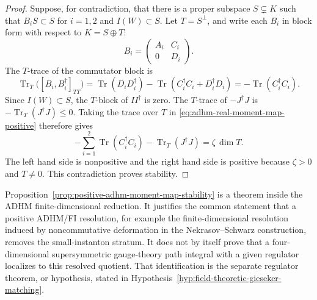 \begin{proof}
Suppose, for contradiction, that there is a proper subspace
\(S\subsetneq K\) such that \(B_iS\subset S\) for \(i=1,2\) and
\(I(W)\subset S\).  Let \(T=S^\perp\), and write each \(B_i\) in block form
with respect to \(K=S\oplus T\):
\[
  B_i=
  \begin{pmatrix}
    A_i&C_i\\
    0&D_i
  \end{pmatrix}.
\]
The \(T\)-trace of the commutator block is
\begin{equation}
  \operatorname{Tr}_T\!\bigl([B_i,B_i^\dagger]_{TT}\bigr)
  =
  \operatorname{Tr}(D_iD_i^\dagger)
  -\operatorname{Tr}(C_i^\dagger C_i+D_i^\dagger D_i)
  =
  -\operatorname{Tr}(C_i^\dagger C_i).
  \label{eq:adhm-stability-tt-commutator-trace}
\end{equation}
Since \(I(W)\subset S\), the \(T\)-block of \(II^\dagger\) is zero.  The
\(T\)-trace of \(-J^\dagger J\) is
\(-\operatorname{Tr}_T(J^\dagger J)\le0\).  Taking the trace over \(T\) in
\eqref{eq:adhm-real-moment-map-positive} therefore gives
\begin{equation}
  -\sum_{i=1}^2\operatorname{Tr}(C_i^\dagger C_i)
  -\operatorname{Tr}_T(J^\dagger J)
  =
  \zeta\,\dim T .
  \label{eq:adhm-positive-fi-contradiction}
\end{equation}
The left hand side is nonpositive and the right hand side is positive
because \(\zeta>0\) and \(T\ne0\).  This contradiction proves stability.
\end{proof}

\begin{remark}
\label{rem:positive-adhm-does-not-prove-field-theory-matching}
Proposition~\ref{prop:positive-adhm-moment-map-stability} is a theorem
inside the ADHM finite-dimensional reduction.  It justifies the common
statement that a positive ADHM/FI resolution, for example the
finite-dimensional resolution induced by noncommutative deformation in the
Nekrasov--Schwarz construction, removes the small-instanton stratum.  It
does not by itself prove that a four-dimensional supersymmetric gauge-theory
path integral with a given regulator localizes to this resolved quotient.
That identification is the separate regulator theorem, or hypothesis, stated
in Hypothesis~\ref{hyp:field-theoretic-gieseker-matching}.
\end{remark}

